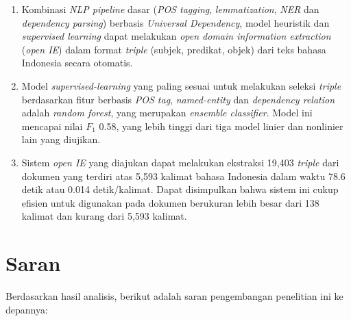 \begin{enumerate}
	\item Kombinasi \textit{NLP pipeline} dasar (\textit{POS tagging}, \textit{lemmatization}, \textit{NER} dan \textit{dependency parsing}) berbasis \textit{Universal Dependency}, model heuristik dan \textit{supervised learning} dapat melakukan \textit{open domain information extraction} (\textit{open IE}) dalam format \textit{triple} (subjek, predikat, objek) dari teks bahasa Indonesia secara otomatis.
	
	\item Model \textit{supervised-learning} yang paling sesuai untuk melakukan seleksi \textit{triple} berdasarkan fitur berbasis \textit{POS tag}, \textit{named-entity} dan \textit{dependency relation} adalah \textit{random forest}, yang merupakan \textit{ensemble classifier}. Model ini mencapai nilai $F_1$ 0.58, yang lebih tinggi dari tiga model linier dan nonlinier lain yang diujikan.
	
	\item Sistem \textit{open IE} yang diajukan dapat melakukan ekstraksi 19,403 \textit{triple} dari dokumen yang terdiri atas 5,593 kalimat bahasa Indonesia dalam waktu 78.6 detik atau 0.014 detik/kalimat. Dapat disimpulkan bahwa sistem ini cukup efisien untuk digunakan pada dokumen berukuran lebih besar dari 138 kalimat dan kurang dari 5,593 kalimat.
\end{enumerate}


\section{Saran}

Berdasarkan hasil analisis, berikut adalah saran pengembangan penelitian ini ke depannya:

